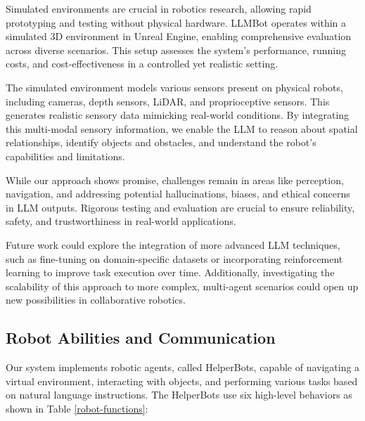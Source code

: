 \documentclass[pdflatex,sn-mathphys-num]{sn-jnl}
\theoremstyle{thmstyleone}
\theoremstyle{thmstyletwo}%
\theoremstyle{thmstylethree}%
\begin{document}
Simulated environments are crucial in robotics research, allowing rapid prototyping and testing without physical hardware. LLMBot operates within a simulated 3D environment in Unreal Engine, enabling comprehensive evaluation across diverse scenarios. This setup assesses the system's performance, running costs, and cost-effectiveness in a controlled yet realistic setting.

The simulated environment models various sensors present on physical robots, including cameras, depth sensors, LiDAR, and proprioceptive sensors. This generates realistic sensory data mimicking real-world conditions. By integrating this multi-modal sensory information, we enable the LLM to reason about spatial relationships, identify objects and obstacles, and understand the robot's capabilities and limitations.

While our approach shows promise, challenges remain in areas like perception, navigation, and addressing potential hallucinations, biases, and ethical concerns in LLM outputs. Rigorous testing and evaluation are crucial to ensure reliability, safety, and trustworthiness in real-world applications.

Future work could explore the integration of more advanced LLM techniques, such as fine-tuning on domain-specific datasets or incorporating reinforcement learning to improve task execution over time. Additionally, investigating the scalability of this approach to more complex, multi-agent scenarios could open up new possibilities in collaborative robotics.

\subsection{Robot Abilities and Communication}
Our system implements robotic agents, called HelperBots, capable of navigating a virtual environment, interacting with objects, and performing various tasks based on natural language instructions. The HelperBots use six high-level behaviors as shown in Table \ref{robot-functions}:
\end{document}
